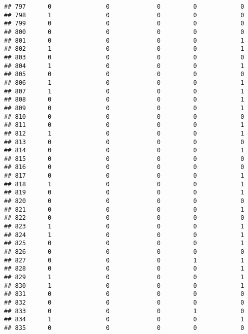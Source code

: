\documentclass[]{article}
\begin{document}
\begin{verbatim}
## 797      0               0             0         0            0
## 798      1               0             0         0            0
## 799      0               0             0         0            0
## 800      0               0             0         0            0
## 801      0               0             0         0            1
## 802      1               0             0         0            1
## 803      0               0             0         0            0
## 804      1               0             0         0            1
## 805      0               0             0         0            0
## 806      1               0             0         0            1
## 807      1               0             0         0            1
## 808      0               0             0         0            1
## 809      0               0             0         0            1
## 810      0               0             0         0            0
## 811      0               0             0         0            1
## 812      1               0             0         0            1
## 813      0               0             0         0            0
## 814      0               0             0         0            1
## 815      0               0             0         0            0
## 816      0               0             0         0            0
## 817      0               0             0         0            1
## 818      1               0             0         0            1
## 819      0               0             0         0            1
## 820      0               0             0         0            0
## 821      0               0             0         0            1
## 822      0               0             0         0            0
## 823      1               0             0         0            1
## 824      1               0             0         0            1
## 825      0               0             0         0            1
## 826      0               0             0         0            0
## 827      0               0             0         1            1
## 828      0               0             0         0            1
## 829      1               0             0         0            1
## 830      1               0             0         0            1
## 831      0               0             0         0            0
## 832      0               0             0         0            0
## 833      0               0             0         1            0
## 834      1               0             0         0            1
## 835      0               0             0         0            0

\end{verbatim}
\end{document}
